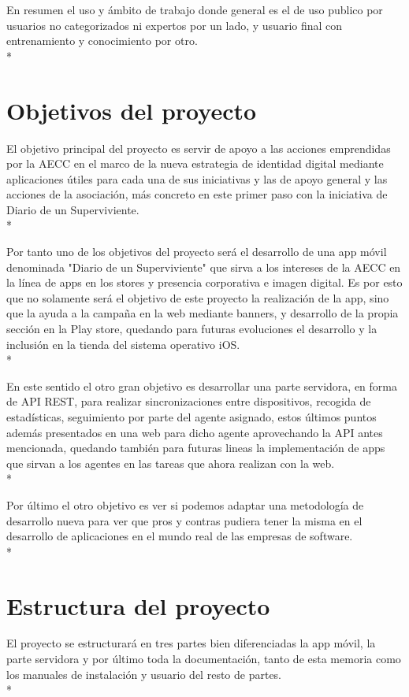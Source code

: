 \documentclass[../pfc.tex]{subfiles}
\begin{document}
En resumen el uso y ámbito de trabajo donde general es el de uso publico por usuarios no categorizados ni expertos por un lado, y usuario final con entrenamiento y conocimiento por otro.\\*

\section{Objetivos del proyecto}
El objetivo principal del proyecto es servir de apoyo a las acciones emprendidas por la AECC en el marco de la nueva estrategia de identidad digital mediante aplicaciones útiles para cada una de sus iniciativas y las de apoyo general y las acciones de la asociación, más concreto en este primer paso con la iniciativa de Diario de un Superviviente.\\*

Por tanto uno de los objetivos del proyecto será el desarrollo de una app móvil denominada "Diario de un Superviviente" que sirva a los intereses de la AECC en la línea de apps en los stores y presencia corporativa e imagen digital. Es por esto que no solamente será el objetivo de este proyecto la realización de la app, sino que la ayuda a la campaña en la web mediante banners, y desarrollo de la propia sección en la Play store, quedando para futuras evoluciones el desarrollo y la inclusión en la tienda del sistema operativo iOS.\\*

En este sentido el otro gran objetivo es desarrollar una parte servidora, en forma de API REST, para realizar sincronizaciones entre dispositivos, recogida de estadísticas, seguimiento por parte del agente asignado, estos últimos puntos además presentados en una web para dicho agente aprovechando la API antes mencionada, quedando también para futuras lineas la implementación de apps que sirvan a los agentes en las tareas que ahora realizan con la web.\\*

Por último el otro objetivo es ver si podemos adaptar una metodología de desarrollo nueva para ver que pros y contras pudiera tener la misma en el desarrollo de aplicaciones en el mundo real de las empresas de software.\\*

\section{Estructura del proyecto}

El proyecto se estructurará en tres partes bien diferenciadas la app móvil, la parte servidora y por último toda la documentación, tanto de esta memoria como los manuales de instalación y usuario del resto de partes.\\* 
\end{document}
